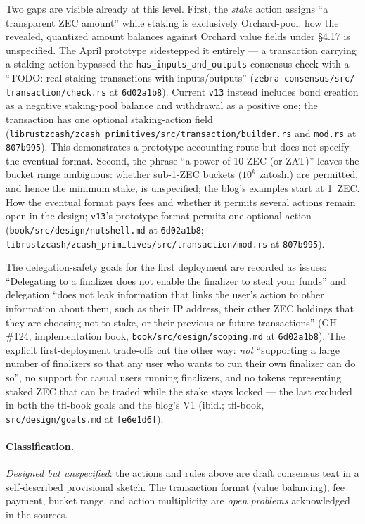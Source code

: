 \documentclass[11pt,a4paper]{article}
\theoremstyle{definition}
\begin{document}
Two gaps are visible already at this level. First, the \emph{stake}
action assigns ``a transparent ZEC amount'' while staking is exclusively
Orchard-pool: how the revealed, quantized amount balances against Orchard
value fields under \href{https://zips.z.cash/protocol/protocol.pdf\#chainvaluepoolbalances}{\S4.17} is unspecified. The April prototype sidestepped
it entirely --- a transaction carrying a staking action bypassed the
\texttt{has\_inputs\_and\_outputs} consensus check with a ``TODO: real
staking transactions with inputs/outputs''
(\texttt{zebra-consensus/\allowbreak src/\allowbreak
transaction/\allowbreak check.rs} at \texttt{6d02a1b8}). Current
\texttt{v13} instead includes bond creation as a negative staking-pool
balance and withdrawal as a positive one; the transaction has one optional
staking-action field
(\texttt{librustzcash/zcash\_primitives/src/transaction/builder.rs} and
\texttt{mod.rs} at \texttt{807b995}). This demonstrates a prototype
accounting route but does not specify the eventual format.
Second, the phrase ``a power of 10 ZEC (or ZAT)'' leaves the bucket range
ambiguous: whether sub-1-ZEC buckets ($10^k$ zatoshi) are permitted, and
hence the minimum stake, is unspecified; the blog's examples start at
1~ZEC. How the eventual format pays fees and whether it permits several
actions remain open in the design; \texttt{v13}'s prototype format permits
one optional action
(\texttt{book/src/design/nutshell.md} at \texttt{6d02a1b8};
\texttt{librustzcash/zcash\_primitives/src/transaction/mod.rs} at
\texttt{807b995}).

The delegation-safety goals for the first deployment are recorded as
issues: ``Delegating to a finalizer does not enable the finalizer to
steal your funds'' and delegation ``does not leak information that links
the user's action to other information about them, such as their IP
address, their other ZEC holdings that they are choosing not to stake, or
their previous or future transactions'' (GH \#124, implementation book,
\texttt{book/src/design/scoping.md} at \texttt{6d02a1b8}). The explicit
first-deployment trade-offs cut the other way: \emph{not} ``supporting a
large number of finalizers so that any user who wants to run their own
finalizer can do so'', no support for casual users running finalizers,
and no tokens representing staked ZEC that can be traded while the
stake stays locked --- the last excluded in both the tfl-book goals and
the blog's V1 (ibid.; tfl-book,
\texttt{src/design/goals.md} at \texttt{fe6e1d6f}).

\paragraph{Classification.} \emph{Designed but unspecified}: the actions
and rules above are draft consensus text in a self-described provisional
sketch. The transaction format (value balancing), fee payment, bucket
range, and action multiplicity are \emph{open problems} acknowledged in
the sources.
\end{document}
